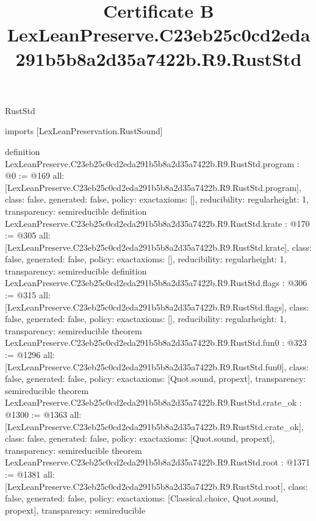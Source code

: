 \begin{lexlean}{RustStd}
\title{Certificate B LexLeanPreserve.C23eb25c0cd2eda291b5b8a2d35a7422b.R9.RustStd}
\begin{coremodule}
imports [LexLeanPreservation.RustSound]

definition LexLeanPreserve.C23eb25c0cd2eda291b5b8a2d35a7422b.R9.RustStd.program : @0 := @169 {
  all: [LexLeanPreserve.C23eb25c0cd2eda291b5b8a2d35a7422b.R9.RustStd.program],
  class: false,
  generated: false,
  policy: exact{axioms: []},
  reducibility: regular{height: 1},
  transparency: semireducible
}
definition LexLeanPreserve.C23eb25c0cd2eda291b5b8a2d35a7422b.R9.RustStd.krate : @170 := @305 {
  all: [LexLeanPreserve.C23eb25c0cd2eda291b5b8a2d35a7422b.R9.RustStd.krate],
  class: false,
  generated: false,
  policy: exact{axioms: []},
  reducibility: regular{height: 1},
  transparency: semireducible
}
definition LexLeanPreserve.C23eb25c0cd2eda291b5b8a2d35a7422b.R9.RustStd.flags : @306 := @315 {
  all: [LexLeanPreserve.C23eb25c0cd2eda291b5b8a2d35a7422b.R9.RustStd.flags],
  class: false,
  generated: false,
  policy: exact{axioms: []},
  reducibility: regular{height: 1},
  transparency: semireducible
}
theorem LexLeanPreserve.C23eb25c0cd2eda291b5b8a2d35a7422b.R9.RustStd.fun0 : @323 := @1296 {
  all: [LexLeanPreserve.C23eb25c0cd2eda291b5b8a2d35a7422b.R9.RustStd.fun0],
  class: false,
  generated: false,
  policy: exact{axioms: [Quot.sound, propext]},
  transparency: semireducible
}
theorem LexLeanPreserve.C23eb25c0cd2eda291b5b8a2d35a7422b.R9.RustStd.crate_ok : @1300 := @1363 {
  all: [LexLeanPreserve.C23eb25c0cd2eda291b5b8a2d35a7422b.R9.RustStd.crate_ok],
  class: false,
  generated: false,
  policy: exact{axioms: [Quot.sound, propext]},
  transparency: semireducible
}
theorem LexLeanPreserve.C23eb25c0cd2eda291b5b8a2d35a7422b.R9.RustStd.root : @1371 := @1381 {
  all: [LexLeanPreserve.C23eb25c0cd2eda291b5b8a2d35a7422b.R9.RustStd.root],
  class: false,
  generated: false,
  policy: exact{axioms: [Classical.choice, Quot.sound, propext]},
  transparency: semireducible
}


\end{coremodule}
\end{lexlean}
